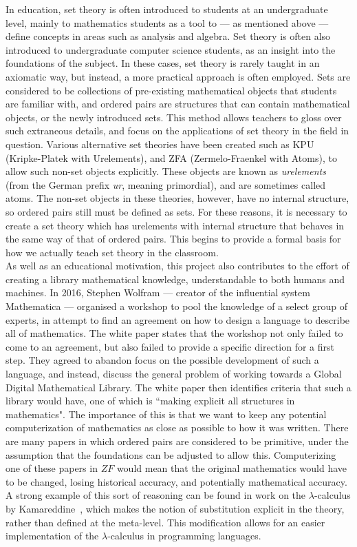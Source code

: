 \documentclass[11pt]{report}
\theoremstyle{definition}
\theoremstyle{theorem}
\theoremstyle{lemma}
\begin{document}
In education, set theory is often introduced to students at an undergraduate level, mainly to mathematics students as a tool to --- as mentioned above --- define concepts in areas such as analysis and algebra.
Set theory is often also introduced to undergraduate computer science students, as an insight into the foundations of the subject.
In these cases, set theory is rarely taught in an axiomatic way, but instead, a more practical approach is often employed. 
Sets are considered to be collections of pre-existing mathematical objects that students are familiar with, and ordered pairs are structures that can contain mathematical objects, or the newly introduced sets.  
This method allows teachers to gloss over such extraneous details, and focus on the applications of set theory in the field in question.
Various alternative set theories have been created such as KPU (Kripke-Platek with Urelements), and ZFA (Zermelo-Fraenkel with Atoms), to allow such non-set objects explicitly.
These objects are known as \emph{urelements} (from the German prefix \emph{ur}, meaning primordial), and are sometimes called atoms.
The non-set objects in these theories, however, have no internal structure, so ordered pairs still must be defined as sets.
For these reasons, it is necessary to create a set theory which has urelements with internal structure that behaves in the same way of that of ordered pairs. 
This begins to provide a formal basis for how we actually teach set theory in the classroom. \\

As well as an educational motivation, this project also contributes to the effort of creating a library mathematical knowledge, understandable to both humans and machines.
In 2016, Stephen Wolfram --- creator of the influential system Mathematica --- organised a workshop to pool the knowledge of a select group of experts, in attempt to find an agreement on how to design a language to describe all of mathematics. 
The white paper states that the workshop not only failed to come to an agreement, but also failed to provide a specific direction for a first step. 
They agreed to abandon focus on the possible development of such a language, and instead, discuss the general problem of working towards a Global Digital Mathematical Library. 
The white paper then identifies criteria that such a library would have, one of which is ``making explicit all structures in mathematics". 
The importance of this is that we want to keep any potential computerization of mathematics as close as possible to how it was written. 
There are many papers in which ordered pairs are considered to be primitive, under the assumption that the foundations can be adjusted to allow this. 
Computerizing one of these papers in $\mathit{ZF}$ would mean that the original mathematics would have to be changed, losing historical accuracy, and potentially mathematical accuracy. 
A strong example of this sort of reasoning can be found in work on the $\lambda$-calculus by Kamareddine~\cite{fairouz}, which makes the notion of substitution explicit in the theory, rather than defined at the meta-level.
This modification allows for an easier implementation of the $\lambda$-calculus in programming languages.\\
\end{document}
